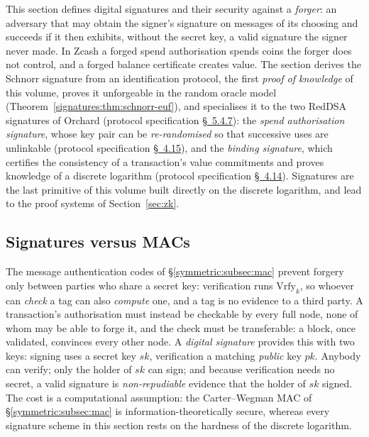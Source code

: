 \documentclass[11pt,a4paper]{article}
\theoremstyle{definition}
\theoremstyle{remark}
\begin{document}
This section defines digital signatures and their security against a
\emph{forger}: an adversary that may obtain the signer's signature on
messages of its choosing and succeeds if it then exhibits, without the
secret key, a valid signature the signer never made. In Zcash a forged
spend authorisation spends coins the forger does not control, and a
forged balance certificate creates value. The section derives the
Schnorr signature from an identification protocol, the first
\emph{proof of knowledge} of this volume, proves it unforgeable in the
random oracle model (Theorem~\ref{signatures:thm:schnorr-euf}), and
specialises it to the two RedDSA signatures of Orchard (protocol
specification
\href{https://zips.z.cash/protocol/protocol.pdf\#concretereddsa}{\S~5.4.7}):
the \emph{spend authorisation signature}, whose key pair can be
\emph{re-randomised} so that successive uses are unlinkable (protocol
specification
\href{https://zips.z.cash/protocol/protocol.pdf\#spendauthsig}{\S~4.15}),
and the \emph{binding signature}, which certifies the consistency of a
transaction's value commitments and proves knowledge of a discrete
logarithm (protocol specification
\href{https://zips.z.cash/protocol/protocol.pdf\#orchardbalance}{\S~4.14}).
Signatures are the last primitive of this volume built directly on the
discrete logarithm, and lead to the proof systems of Section~\ref{sec:zk}.

\subsection{Signatures versus MACs}\label{signatures:subsec:vsmac}

The message authentication codes of \S\ref{symmetric:subsec:mac}
prevent forgery only between parties who share a secret key:
verification runs \(\mathrm{Vrfy}_{k}\), so whoever can \emph{check} a
tag can also \emph{compute} one, and a tag is no evidence to a third
party. A transaction's authorisation must instead be checkable by
every full node, none of whom may be able to forge it, and the check
must be transferable: a block, once validated, convinces every other
node. A \emph{digital signature} provides this with two keys: signing
uses a secret key \(sk\), verification a matching \emph{public} key
\(pk\). Anybody can verify; only the holder of \(sk\) can sign; and
because verification needs no secret, a valid signature is
\emph{non-repudiable} evidence that the holder of \(sk\) signed. The
cost is a computational assumption: the Carter--Wegman MAC of
\S\ref{symmetric:subsec:mac} is information-theoretically secure,
whereas every signature scheme in this section rests on the hardness
of the discrete logarithm.
\end{document}
